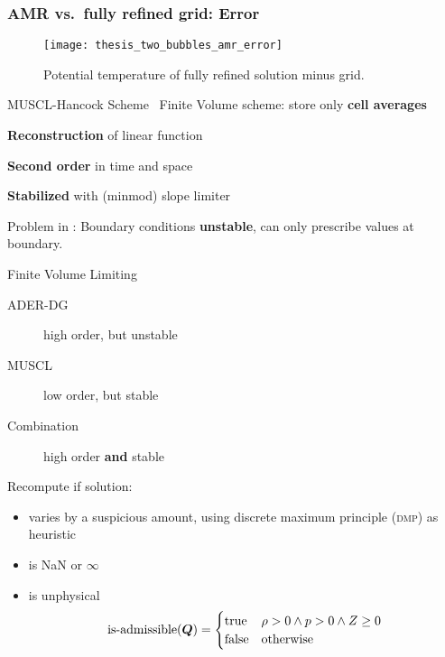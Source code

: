 \documentclass[aspectratio=169]{beamer}
\begin{document}
\begin{frame}
  \frametitle{AMR vs.\ fully refined grid: Error}
  \begin{figure}[H]
    \centering
     {
\texttt{[image: thesis\_two\_bubbles\_amr\_error]}
  }
\caption{Potential temperature of fully refined solution minus \amr{} grid.}
  \end{figure}
\end{frame}

\begin{frame}{MUSCL-Hancock Scheme~}
  Finite Volume scheme: store only \textbf{cell averages}

  \textbf{Reconstruction} of linear function

  \textbf{Second order} in time and space

  \textbf{Stabilized} with (minmod) slope limiter

  Problem in \exahype{}: Boundary conditions \textbf{unstable}, can only prescribe values at boundary.
\end{frame}

\begin{frame}{Finite Volume Limiting}
  \begin{description}
\item[ADER-DG] high order, but unstable
\item[MUSCL] low order, but stable
\item[Combination] high order \textbf{and} stable
  \end{description}

Recompute if solution:
\begin{itemize}
\item varies by a suspicious amount, using discrete maximum principle (\textsc{dmp}) as heuristic
\item is NaN or $\infty$
\item is unphysical
 \begin{equation}
  \label{eq:limiting-physical}
  \operatorname{is-admissible}(\bm{Q}) =
  \begin{cases}
    \text{true} & \rho > 0 \land p > 0 \land Z \geq 0 \\
    \text{false} & \text{otherwise}
  \end{cases}
\end{equation}
\end{itemize}
\end{frame}
\end{document}
